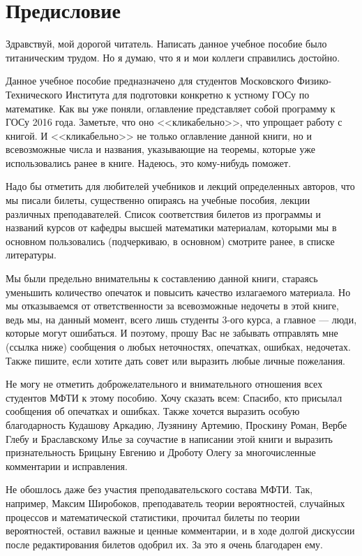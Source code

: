 \chapter{Предисловие}
Здравствуй, мой дорогой читатель. Написать данное учебное пособие было титаническим трудом. Но я думаю, что я и мои коллеги справились достойно.

Данное учебное пособие предназначено для студентов Московского Физико-Технического Института для подготовки конкретно к устному ГОСу по математике. Как вы уже поняли, оглавление представляет собой программу к ГОСу 2016 года. Заметьте, что оно <<кликабельно>>, что упрощает работу с книгой. И <<кликабельно>> не только оглавление данной книги, но и всевозможные числа и названия, указывающие на теоремы, которые уже использовались ранее в книге. Надеюсь, это кому-нибудь поможет. 

Надо бы отметить для любителей учебников и лекций определенных авторов, что мы писали билеты, существенно опираясь на учебные пособия, лекции различных преподавателей. Список соответствия билетов из программы и названий курсов от кафедры высшей математики материалам, которыми мы в основном пользовались (подчеркиваю, в основном) смотрите ранее, в списке литературы.

Мы были предельно внимательны к составлению данной книги, стараясь уменьшить количество опечаток и повысить качество излагаемого материала. Но мы отказываемся от ответственности за всевозможные недочеты в этой книге, ведь мы, на данный момент, всего лишь студенты 3-ого курса, а главное --- люди, которые могут ошибаться. И поэтому, прошу Вас не забывать отправлять мне (ссылка ниже) сообщения о любых неточностях, опечатках, ошибках, недочетах. Также пишите, если хотите дать совет или выразить любые личные пожелания. 

Не могу не отметить доброжелательного и внимательного отношения всех студентов МФТИ к этому пособию. Хочу сказать всем: \glqq Спасибо\grqq, кто присылал сообщения об опечатках и ошибках. Также хочется выразить особую благодарность Кудашову Аркадию, Лузянину Артемию, Проскину Роман, Вербе Глебу и Браславскому Илье за соучастие в написании этой книги и выразить признательность Брицыну Евгению и Дроботу Олегу за многочисленные комментарии и исправления.

Не обошлось даже без участия преподавательского состава МФТИ. Так, например, Максим Широбоков, преподаватель теории вероятностей, случайных процессов и математической статистики, прочитал билеты по теории вероятностей, оставил важные и ценные комментарии, и в ходе долгой дискуссии после редактирования билетов одобрил их. За это я очень благодарен ему.
 
